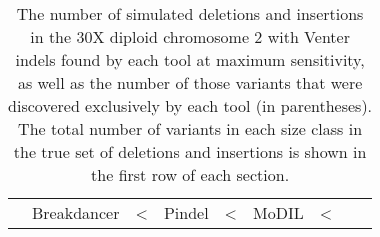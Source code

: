 \begin{table}[t]
\begin{center}
\begin{tabular}{r|rrr|rrrrr}
&  Breakdancer & <%
&  Pindel          & <%
&  MoDIL          & <%
\hline
\end{tabular}
\end{center}
\caption{The number of simulated deletions and insertions in the 30X diploid chromosome 2 with Venter indels found by each tool at maximum sensitivity, as well as the number of those variants that were discovered exclusively by each tool (in parentheses). The total number of variants in each size class in the true set of deletions and insertions is shown in the first row of each section.}
\label{chr2DeletionAndInsertionPredsMaxSensitivity}
\end{table}

